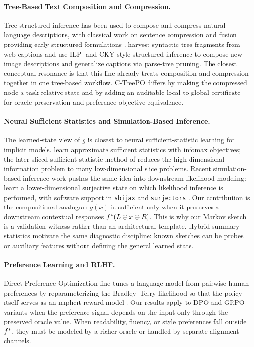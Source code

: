 \paragraph{Tree-Based Text Composition and Compression.}
Tree-structured inference has been used to compose and compress
natural-language descriptions, with classical work on sentence
compression and fusion providing early structured formulations
\citep{KnightMarcu2000SentenceCompression,BarzilayMcKeown2005SentenceFusion,ClarkeLapata2008ILPSentenceCompression}.
\citet{KuznetsovaEtAl2014TreeTalk} harvest syntactic tree fragments from
web captions and use ILP- and CKY-style structured inference to compose
new image descriptions and generalize captions via parse-tree pruning.
The closest conceptual resonance is that this line already treats
composition and compression together in one tree-based workflow. C-TreePO
differs by making the compressed node a task-relative state and by adding
an auditable local-to-global certificate for oracle preservation and
preference-objective equivalence.

\paragraph{Neural Sufficient Statistics and Simulation-Based Inference.}
The learned-state view of $g$ is closest to neural sufficient-statistic
learning for implicit models. \citet{ChenEtAl2021NASS} learn
approximate sufficient statistics with infomax objectives; the later
sliced sufficient-statistic method of \citet{ChenGutmannWeller2023SSS}
reduces the high-dimensional information problem to many
low-dimensional slice problems. Recent simulation-based inference work
pushes the same idea into downstream likelihood modeling:
\citet{DirmeierAlbertPerezCruz2025SSNL} learn a lower-dimensional
surjective state on which likelihood inference is performed, with
software support in \texttt{sbijax} and \texttt{surjectors}
\citep{DirmeierUlzegaMiraAlbert2024SBIJAX,Dirmeier2024Surjectors}.
Our contribution is the compositional analogue: $g(x)$ is sufficient
only when it preserves all downstream contextual responses
$f^\ast(L \oplus x \oplus R)$. This is why our Markov sketch is a
validation witness rather than an architectural template. Hybrid summary
statistics \citep{MakinenEtAl2024HybridSummaryStatistics} motivate the
same diagnostic discipline: known sketches can be probes or auxiliary
features without defining the general learned state.

\paragraph{Preference Learning and RLHF.}
Direct Preference Optimization fine-tunes a language model from pairwise
human preferences by reparameterizing the Bradley--Terry likelihood so
that the policy itself serves as an implicit reward model
\citep{BradleyTerry1952,RafailovEtAl2023DPO}. Our results apply to DPO
and GRPO variants when the preference signal depends on the input only
through the preserved oracle value. When readability, fluency, or style
preferences fall outside $f^\ast$, they must be modeled by a richer
oracle or handled by separate alignment channels.

